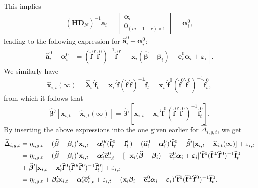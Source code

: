 \documentclass[12pt,fleqn]{article}
\def\*#1{\mathbf{#1}}
\def\+#1{\boldsymbol{#1}}
\begin{document}
This implies
\begin{align}
(\overline{\*{H}}\*{D}_N)^{-1}\*a_i = \left[\begin{array}{c} \+\alpha_i \\
    \*{0}_{(m+1-r)\times 1} \end{array}\right] = \+\alpha_i^0,
\end{align}
leading to the following expression for $\widehat{\*a}_i^0-\+\alpha_i^0$:
\begin{align}
\widehat{\*a}_i^0 - \+\alpha_i^0 & = (\widehat{\*f}^{0\prime}\widehat{\*f}^0)^{-1}\widehat{\*f}^{0\prime}[- \*x_{i}(\widehat{\+\beta}-\+\beta_i)  - \overline{\*e}_{r}^0\+\alpha_i +  \+\varepsilon_{i} ].
\end{align}
We similarly have
\begin{equation}
\widehat{\*x}_{i,t}(\infty) = \widehat{\+\lambda}_i'\widehat{\*f}_t = \*x_i'\widehat{\*f}( \widehat{\*f}' \widehat{\*f} )^{-1} \widehat{\*f}_t= \*x_i'\widehat{\*f}^0( \widehat{\*f}^{0\prime} \widehat{\*f}^0 )^{-1} \widehat{\*f}_t^0 ,
\end{equation}
from which it follows that
\begin{equation}
\widehat{\+\beta}'[\*x_{i,t} - \widehat{\*x}_{i,t}(\infty)] = \widehat{\+\beta}'[\*x_{i,t} - \*x_i'\widehat{\*f}^0( \widehat{\*f}^{0\prime} \widehat{\*f}^0 )^{-1} \widehat{\*f}_t^0].
\end{equation}
By inserting the above expressions into the one given earlier for $\widehat \Delta_{i,g,t}$, we get
\begin{align}
\widehat \Delta_{i,g,t} & = \eta_{i,g,t} - (\widehat{\+\beta} - \+\beta_i)'\*x_{i,t} - \+\alpha_i^{0\prime}(\widehat{\*f}_t^0-\*f_t^0) - (\widehat{\*a}_i^{0} - \+\alpha_i^0)'\widehat{\*f}_t^0 + \widehat{\+\beta}'[\*x_{i,t} - \widehat{\*x}_{i,t}(\infty)] + \varepsilon_{i,t}\notag\\
& = \eta_{i,g,t} - (\widehat{\+\beta} - \+\beta_i)'\*x_{i,t} - \+\alpha_i'\overline{\*e}_{r,t}^0 - [- \*x_{i}(\widehat{\+\beta}-\+\beta_i)  - \overline{\*e}_{r}^0\+\alpha_i +  \+\varepsilon_{i} ]' \widehat{\*f}^{0} (\widehat{\*f}^{0\prime}\widehat{\*f}^0)^{-1}\widehat{\*f}_t^0\notag\\
& + \widehat{\+\beta}'[\*x_{i,t} - \*x_i'\widehat{\*f}^0( \widehat{\*f}^{0\prime} \widehat{\*f}^0 )^{-1} \widehat{\*f}_t^0] + \varepsilon_{i,t}\notag\\
& = \eta_{i,g,t} + \+\beta_i'\*x_{i,t} - \+\alpha_i'\overline{\*e}_{r,t}^0 + \varepsilon_{i,t} - ( \*x_{i}\+\beta_i  - \overline{\*e}_{r}^0\+\alpha_i +  \+\varepsilon_{i} )' \widehat{\*f}^{0} (\widehat{\*f}^{0\prime}\widehat{\*f}^0)^{-1}\widehat{\*f}_t^0  .
\end{align}
\end{document}
